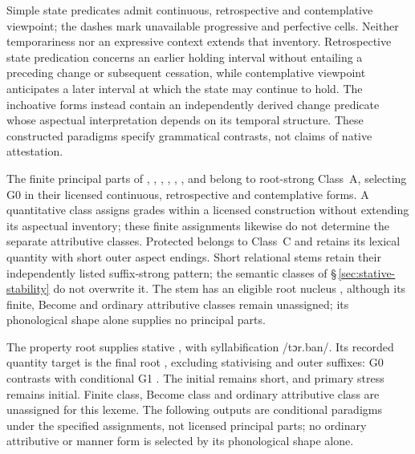 Simple state predicates admit continuous, retrospective and contemplative
viewpoint; the dashes mark unavailable progressive and perfective cells.
Neither temporariness nor an expressive context extends that inventory.
Retrospective state predication concerns an earlier holding interval without
entailing a preceding change or subsequent cessation, while contemplative
viewpoint anticipates a later interval at which the state may continue to
hold. The inchoative forms instead contain an independently derived change
predicate whose aspectual interpretation depends on its temporal structure.
These constructed paradigms specify grammatical contrasts, not claims of
native attestation.

The finite principal parts of , ,
, , , ,
 and  belong to root-strong Class~A, selecting G0
in their licensed continuous, retrospective and contemplative forms. A
quantitative class assigns grades within a licensed construction without
extending its aspectual inventory; these finite assignments likewise do not
determine the separate attributive classes. Protected
 belongs to Class~C and retains its lexical quantity with
short outer aspect endings. Short relational stems retain their independently
listed suffix-strong pattern; the semantic classes of §\,\ref{sec:stative-stability} do not overwrite it.
The stem   has an eligible root nucleus
, although its finite, Become and ordinary attributive classes remain
unassigned; its phonological shape alone supplies no principal parts.

The property root   supplies stative
 , with syllabification /tɔr.ban/.
Its recorded quantity target is the final root , excluding
stativising  and outer suffixes: G0  contrasts
with conditional G1 . The initial  remains short,
and primary stress remains initial. Finite class, Become class and ordinary
attributive class are unassigned for this lexeme. The following outputs
are conditional paradigms under the specified assignments, not licensed
principal parts; no ordinary attributive or manner form is selected by
its phonological shape alone.

